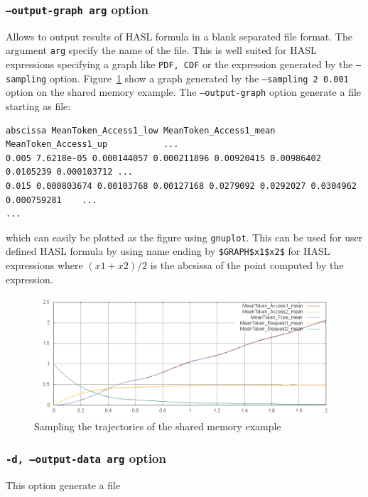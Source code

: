 \documentclass{article}
\begin{document}
\subsubsection{\texttt{--output-graph arg} option}
Allows to output results of HASL formula in a blank separated file
format. The argument \texttt{arg} specify the name of the file.  This
is well suited for HASL expressions specifying a graph like
\texttt{PDF, CDF} or the expression generated by the
\texttt{--sampling} option.  Figure~\ref{fig:sampling} show a graph
generated by the \texttt{--sampling 2 0.001} option on the shared
memory example. The \texttt{--output-graph} option generate a file
starting as file:
\begin{scriptsize}
\begin{verbatim}
abscissa MeanToken_Access1_low MeanToken_Access1_mean MeanToken_Access1_up           ... 
0.005 7.6218e-05 0.000144057 0.000211896 0.00920415 0.00986402 0.0105239 0.000103712 ...
0.015 0.000803674 0.00103768 0.00127168 0.0279092 0.0292027 0.0304962 0.000759281    ...
...
\end{verbatim}
\end{scriptsize}
which can easily be plotted as the figure using \texttt{gnuplot}.
This can be used for user defined HASL formula by using name ending by
\verb|$GRAPH$x1$x2$| for HASL expressions where $(x1+x2)/2$ is the
abcsissa of the point computed by the expression.

\begin{figure}[h]
  \centering
  \includegraphics[width=1.01\textwidth]{figures/sampling.png}
  \caption{Sampling the trajectories of the shared memory example}
  \label{fig:sampling}
\end{figure}

\subsubsection{\texttt{-d, --output-data arg} option}
This option generate a file 
\end{document}
